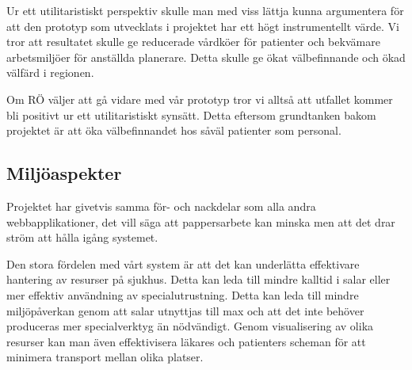 Ur ett utilitaristiskt perspektiv skulle man med viss lättja kunna argumentera för att den prototyp som utvecklats i projektet har ett högt instrumentellt värde. Vi tror att resultatet skulle ge reducerade vårdköer för patienter och bekvämare arbetsmiljöer för anställda planerare. Detta skulle ge ökat välbefinnande och ökad välfärd i regionen. 

Om RÖ väljer att gå vidare med vår prototyp tror vi alltså att utfallet kommer bli positivt ur ett utilitaristiskt synsätt. Detta eftersom grundtanken bakom projektet är att öka välbefinnandet hos såväl patienter som personal. 

\subsection{Miljöaspekter}
Projektet har givetvis samma för- och nackdelar som alla andra webbapplikationer, det vill säga att pappersarbete kan minska men att det drar ström att hålla igång systemet.

Den stora fördelen med vårt system är att det kan underlätta effektivare hantering av resurser på sjukhus. Detta kan leda till mindre kalltid i salar eller mer effektiv användning av specialutrustning. Detta kan leda till mindre miljöpåverkan genom att salar utnyttjas till max och att det inte behöver produceras mer specialverktyg än nödvändigt. Genom visualisering av olika resurser kan man även effektivisera läkares och patienters scheman för att minimera transport mellan olika platser. 